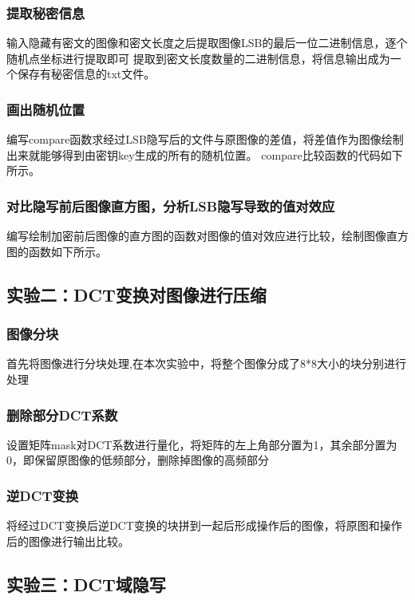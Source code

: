 \documentclass[a4paper,11pt,UTF8]{ctexart}
\begin{document}
    \subsubsection{提取秘密信息}
      输入隐藏有密文的图像和密文长度之后提取图像LSB的最后一位二进制信息，逐个随机点坐标进行提取即可
      提取到密文长度数量的二进制信息，将信息输出成为一个保存有秘密信息的txt文件。

    \subsubsection{画出随机位置}
      编写compare函数求经过LSB隐写后的文件与原图像的差值，将差值作为图像绘制出来就能够得到由密钥key生成的所有的随机位置。
      compare比较函数的代码如下所示。
      

    \subsubsection{对比隐写前后图像直方图，分析LSB隐写导致的值对效应}
      编写绘制加密前后图像的直方图的函数对图像的值对效应进行比较，绘制图像直方图的函数如下所示。
      

 
  \subsection{实验二：DCT变换对图像进行压缩}
    \subsubsection{图像分块}
      首先将图像进行分块处理,在本次实验中，将整个图像分成了8*8大小的块分别进行处理
    \subsubsection{删除部分DCT系数}
      设置矩阵mask对DCT系数进行量化，将矩阵的左上角部分置为1，其余部分置为0，即保留原图像的低频部分，删除掉图像的高频部分
    \subsubsection{逆DCT变换}
      将经过DCT变换后逆DCT变换的块拼到一起后形成操作后的图像，将原图和操作后的图像进行输出比较。

  \subsection{实验三：DCT域隐写}
\end{document}
